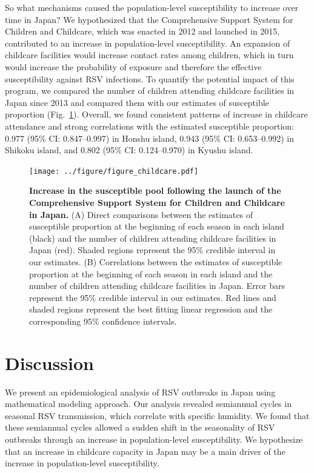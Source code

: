 \documentclass[12pt]{article}
\newcommand{\fref}[1]{Fig.~\ref{fig:#1}}
\begin{document}
So what mechanisms caused the population-level susceptibility to increase over time in Japan?
We hypothesized that the Comprehensive Support System for Children and Childcare, which was enacted in 2012 and launched in 2015, contributed to an increase in population-level susceptibility.
An expansion of childcare facilities would increase contact rates among children, which in turn would increase the probability of exposure and therefore the effective susceptibility against RSV infections.
To quantify the potential impact of this program, we compared the number of children attending childcare facilities in Japan since 2013 and compared them with our estimates of susceptible proportion (\fref{fig4}).
Overall, we found consistent patterns of increase in childcare attendance and strong correlations with the estimated susceptible proportion: 0.977 (95\% CI: 0.847--0.997) in Honshu island, 0.943 (95\% CI: 0.653--0.992) in Shikoku island, and 0.802 (95\% CI: 0.124--0.970) in Kyushu island.

\begin{figure}[!th]
\texttt{[image: ../figure/figure\_childcare.pdf]}
\caption{
\textbf{Increase in the susceptible pool following the launch of the Comprehensive Support System for Children and Childcare in Japan.}
(A) Direct comparisons between the estimates of susceptible proportion at the beginning of each season in each island (black) and the number of children attending childcare facilities in Japan (red).
Shaded regions represent the 95\% credible interval in our estimates.
(B) Correlations between the estimates of susceptible proportion at the beginning of each season in each island and the number of children attending childcare facilities in Japan.
Error bars represent  the 95\% credible interval in our estimates.
Red lines and shaded regions represent the best fitting linear regression and the corresponding 95\% confidence intervals.
}
\label{fig:fig4}
\end{figure}

\section*{Discussion}

We present an epidemiological analysis of RSV outbreaks in Japan using mathematical modeling approach.
Our analysis revealed semiannual cycles in seasonal RSV transmission, which correlate with specific humidity.
We found that these semiannual cycles allowed a sudden shift in the seasonality of RSV outbreaks through an increase in population-level susceptibility.
We  hypothesize that an increase in childcare capacity in Japan may be a main driver of the increase in population-level susceptibility.
\end{document}
